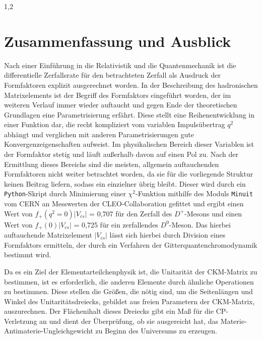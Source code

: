 \documentclass[11pt,a4paper,twoside]{report}
\begin{document}
\begin{spacing}{1,2}
\chapter{Zusammenfassung und Ausblick}
Nach einer Einführung in die Relativistik und die Quantenmechanik ist die differentielle Zerfallsrate für den betrachteten Zerfall als Ausdruck der 
Formfaktoren explizit ausgerechnet worden. In der Beschreibung des hadronischen Matrixelements ist der Begriff des Formfaktors eingeführt worden,
der im weiteren Verlauf immer wieder auftaucht und gegen Ende der theoretischen Grundlagen eine Parametrisierung erfährt. Diese stellt eine 
Reihenentwicklung in einer Funktion dar, die recht kompliziert vom variablen Impulsübertrag $q^2$ abhängt und verglichen mit anderen Parametrisierungen
gute Konvergenzeigenschaften aufweist. Im physikalischen Bereich dieser Variablen ist der Formfaktor stetig und läuft außerhalb davon auf einen Pol zu.
Nach der Ermittlung dieses Bereichs sind die meisten, allgemein auftauchenden Formfaktoren nicht weiter betrachtet worden, da sie für die vorliegende
Struktur keinen Beitrag liefern, sodass ein einzielner übrig bleibt. Dieser wird durch ein \texttt{Python}-Skript durch Minimierung einer 
$\chi^2$-Funktion mithilfe des Moduls \texttt{Minuit} vom CERN an Messwerten der CLEO-Collaboration gefittet und ergibt einen Wert von $f_+(q^2=0) |V_{cs}|$ = 0,707 für den Zerfall des $D^+$-Mesons
und einen Wert von $f_+(0)|V_{cs}|$ = 0,725 für ein zerfallendes $D^0$-Meson. Das hierbei auftauchende Matrixelement $|V_{cs}|$ lässt sich hierbei
durch Division eines Formfaktors ermitteln, der durch ein Verfahren der Gitterquantenchromodynamik bestimmt wird. 

\noindent
Da es ein Ziel der Elementarteilchenphysik ist, die Unitarität der CKM-Matrix zu bestimmen, ist es erforderlich, die anderen Elemente durch ähnliche
Operationen zu bestimmen. Diese stellen die Größen, die nötig sind, um die Seitenlängen und Winkel des Unitaritätsdreiecks, gebildet aus freien 
Parametern der CKM-Matrix, auszurechnen. Der Flächenihalt dieses Dreiecks gibt ein Maß für die CP-Verletzung an und dient der Überprüfung, ob sie
ausgereicht hat, das Materie-Antimaterie-Ungleichgewicht zu Beginn des Universums zu erzeugen. 



\begin{appendix}
%
\end{appendix}
\newpage



\end{spacing}
\end{document}
